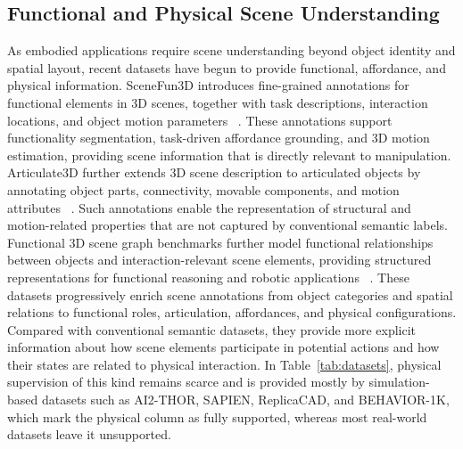 \documentclass{SCIS2026}
\begin{document}
\subsection{Functional and Physical Scene Understanding}
\label{subsec:functional_physical_datasets}
As embodied applications require scene understanding beyond object identity and spatial layout, recent datasets have begun to provide functional, affordance, and physical information. SceneFun3D introduces fine-grained annotations for functional elements in 3D scenes, together with task descriptions, interaction locations, and object motion parameters ~\cite{delitzas2024scenefun3d}. These annotations support functionality segmentation, task-driven affordance grounding, and 3D motion estimation, providing scene information that is directly relevant to manipulation. Articulate3D further extends 3D scene description to articulated objects by
annotating object parts, connectivity, movable components, and motion attributes ~\cite{halacheva2025articulate3d}. Such annotations enable the representation of structural and motion-related properties that are not captured by conventional semantic labels. Functional 3D scene graph benchmarks further model functional relationships between objects and interaction-relevant scene elements, providing structured representations for functional reasoning and robotic applications ~\cite{zhang2025functional3d}. These datasets progressively enrich scene annotations from object categories and spatial relations to functional roles, articulation, affordances, and physical configurations. Compared with conventional semantic datasets, they provide more explicit information about how scene elements participate in potential actions and how their states are related to physical interaction. In Table~\ref{tab:datasets}, physical supervision of this kind remains scarce and is provided mostly by simulation-based datasets such as AI2-THOR, SAPIEN, ReplicaCAD, and BEHAVIOR-1K, which mark the physical column as fully supported, whereas most real-world datasets leave it unsupported.
\end{document}
